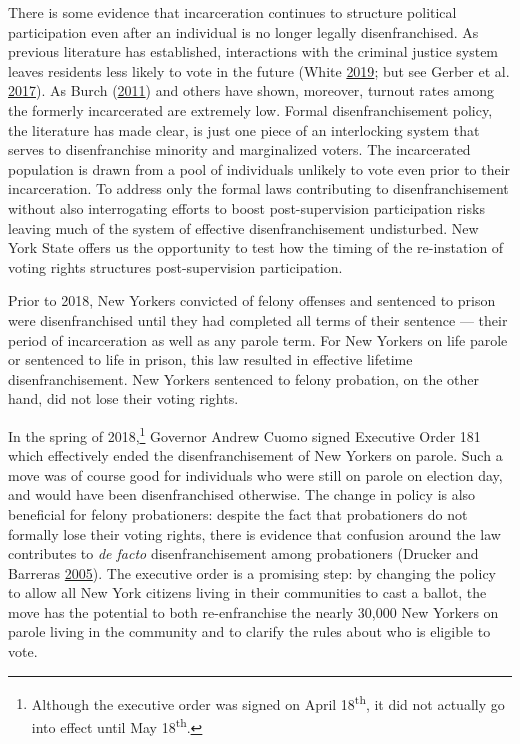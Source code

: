 \documentclass[
  12pt,
]{article}
\begin{document}
There is some evidence that incarceration continues to structure political participation even after an individual is no longer legally disenfranchised. As previous literature has established, interactions with the criminal justice system leaves residents less likely to vote in the future (White \protect\hyperlink{ref-White2019}{2019}; but see Gerber et al. \protect\hyperlink{ref-Gerber2017}{2017}). As Burch (\protect\hyperlink{ref-Burch2011}{2011}) and others have shown, moreover, turnout rates among the formerly incarcerated are extremely low. Formal disenfranchisement policy, the literature has made clear, is just one piece of an interlocking system that serves to disenfranchise minority and marginalized voters. The incarcerated population is drawn from a pool of individuals unlikely to vote even prior to their incarceration. To address only the formal laws contributing to disenfranchisement without also interrogating efforts to boost post-supervision participation risks leaving much of the system of effective disenfranchisement undisturbed. New York State offers us the opportunity to test how the timing of the re-instation of voting rights structures post-supervision participation.

Prior to 2018, New Yorkers convicted of felony offenses and sentenced to prison were disenfranchised until they had completed all terms of their sentence --- their period of incarceration as well as any parole term. For New Yorkers on life parole or sentenced to life in prison, this law resulted in effective lifetime disenfranchisement. New Yorkers sentenced to felony probation, on the other hand, did not lose their voting rights.

In the spring of 2018,\footnote{Although the executive order was signed on April 18\textsuperscript{th}, it did not actually go into effect until May 18\textsuperscript{th}.} Governor Andrew Cuomo signed Executive Order 181 which effectively ended the disenfranchisement of New Yorkers on parole. Such a move was of course good for individuals who were still on parole on election day, and would have been disenfranchised otherwise. The change in policy is also beneficial for felony probationers: despite the fact that probationers do not formally lose their voting rights, there is evidence that confusion around the law contributes to \emph{de facto} disenfranchisement among probationers (Drucker and Barreras \protect\hyperlink{ref-Drucker2005}{2005}). The executive order is a promising step: by changing the policy to allow all New York citizens living in their communities to cast a ballot, the move has the potential to both re-enfranchise the nearly 30,000 New Yorkers on parole living in the community and to clarify the rules about who is eligible to vote.
\end{document}
